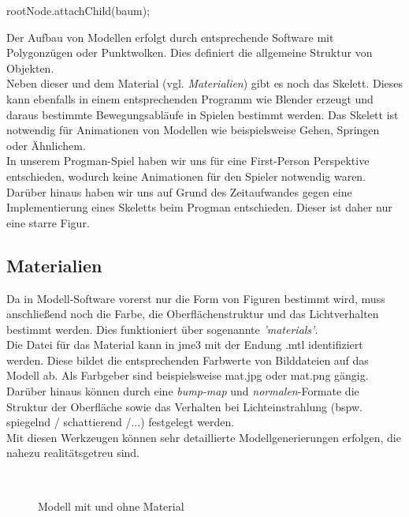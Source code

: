 \begin{center}
	{rootNode.attachChild(baum);}
\end{center} Der Aufbau von Modellen erfolgt durch entsprechende Software mit Polygonzügen oder Punktwolken. Dies definiert die allgemeine Struktur von Objekten.\\
Neben dieser und dem Material (vgl. \emph{Materialien}) gibt es noch das Skelett. Dieses kann ebenfalls in einem entsprechenden Programm wie Blender erzeugt und daraus bestimmte Bewegungsabläufe in Spielen bestimmt werden.
Das Skelett ist notwendig für Animationen von Modellen wie beispielsweise Gehen, Springen oder Ähnlichem.\\
In unserem Progman-Spiel haben wir uns für eine First-Person Perspektive entschieden, wodurch keine Animationen für den Spieler notwendig waren. Darüber hinaus haben wir uns auf Grund des Zeitaufwandes gegen eine Implementierung eines Skeletts beim Progman entschieden. Dieser ist daher nur eine starre Figur.

\pagebreak

\subsection{Materialien}
Da in Modell-Software vorerst nur die Form von Figuren bestimmt wird, muss anschließend noch die Farbe, die Oberflächenstruktur und das Lichtverhalten bestimmt werden. Dies funktioniert über sogenannte \emph{'materials'}.\\
Die Datei für das Material kann in jme3 mit der Endung .mtl identifiziert werden. Diese bildet die entsprechenden Farbwerte von Bilddateien auf das Modell ab. Als Farbgeber sind beispielsweise mat.jpg oder mat.png gängig. Darüber hinaus können durch eine \emph{bump-map} und \emph{normalen}-Formate die Struktur der Oberfläche sowie das Verhalten bei Lichteinstrahlung (bspw. spiegelnd / schattierend /...) festgelegt werden. \\ Mit diesen Werkzeugen können sehr detaillierte Modellgenerierungen erfolgen, die nahezu realitätsgetreu sind.



\begin{figure}[h!]
	\myfloatalign
	 \quad
	 \\
	\caption[Materials auf Modellen]{Modell mit und ohne Material \cite{Fig1}}\label{fig:example}
	
\end{figure}







